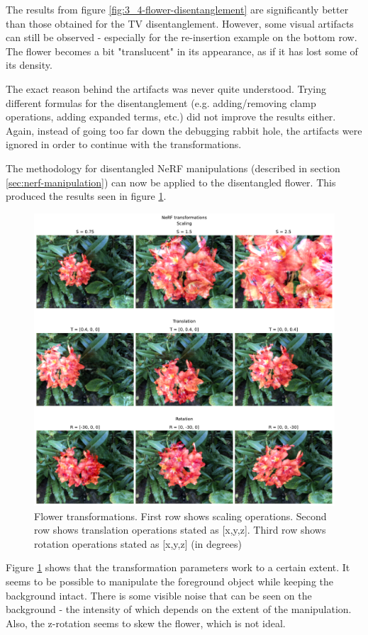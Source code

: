 The results from figure \ref{fig:3_4-flower-disentanglement} are significantly better than those obtained for the TV disentanglement. However, some visual artifacts can still be observed - especially for the re-insertion example on the bottom row. The flower becomes a bit "translucent" in its appearance, as if it has lost some of its density.

The exact reason behind the artifacts was never quite understood. Trying different formulas for the disentanglement (e.g. adding/removing clamp operations, adding expanded terms, etc.) did not improve the results either. Again, instead of going too far down the debugging rabbit hole, the artifacts were ignored in order to continue with the transformations.

The methodology for disentangled NeRF manipulations (described in section \ref{sec:nerf-manipulation}) can now be applied to the disentangled flower. This produced the results seen in figure \ref{fig:3_4-flower-transformations-successful}.

\begin{figure}[H]
    \centering
    \includegraphics[width=1.0\textwidth]{figures/3_4-flower-transformations-successful.pdf}
    \caption{Flower transformations. First row shows scaling operations. Second row shows translation operations stated as [x,y,z]. Third row shows rotation operations stated as [x,y,z] (in degrees)}
    \label{fig:3_4-flower-transformations-successful}
\end{figure}
Figure \ref{fig:3_4-flower-transformations-successful} shows that the transformation parameters work to a certain extent. It seems to be possible to manipulate the foreground object while keeping the background intact. There is some visible noise that can be seen on the background - the intensity of which depends on the extent of the manipulation. Also, the z-rotation seems to skew the flower, which is not ideal.

